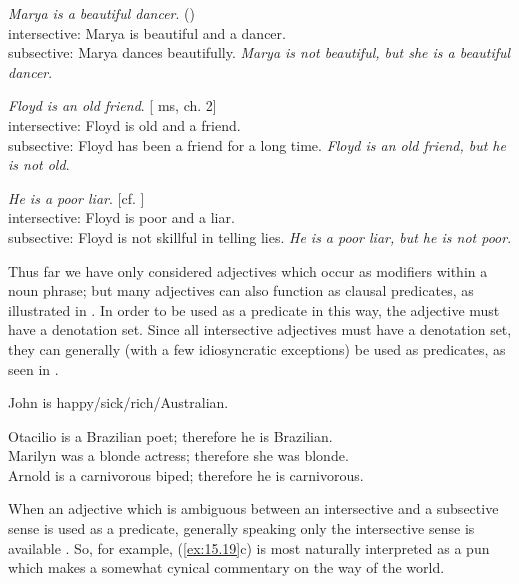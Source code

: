 \ea \label{ex:15.14}
\ea   \textit{Marya is a beautiful dancer}.   (\citealt{Siegel1976})\\
intersective: Marya is beautiful and a dancer.\\
subsective: Marya dances beautifully.
\ex  \textit{Marya is not beautiful, but she is a beautiful dancer}.
\z \z

\ea \label{ex:15.15}
\ea  \textit{Floyd is an old friend}.  \hfill [\citealt{Morzycki2013} ms, ch. 2]\\
intersective: Floyd is old and a friend.\\
subsective: Floyd has been a friend for a long time.
\ex  \textit{Floyd is an old friend, but he is not old}.
\z \z

\ea \label{ex:15.16}
\ea   \textit{He is a poor liar}.  \hfill [cf. \citealt{Bolinger1967}]\\
intersective: Floyd is poor and a liar.\\
subsective: Floyd is not skillful in telling lies.
\ex  \textit{He is a poor liar, but he is not poor}.
\z \z


Thus far we have only considered adjectives which occur as modifiers within a noun phrase; but many adjectives can also function as clausal predicates, as illustrated in . In order to be used as a predicate in this way, the adjective must have a denotation set. Since all intersective adjectives must have a denotation set, they can generally (with a few idiosyncratic exceptions) be used as predicates, as seen in .


\ea \label{ex:15.17}
John is happy/sick/rich/Australian.
\z

\ea \label{ex:15.18}
\ea  Otacilio is a Brazilian poet; therefore he is Brazilian.\\
\ex Marilyn was a blonde actress; therefore she was blonde.\\
\ex Arnold is a carnivorous biped; therefore he is carnivorous.
                       \z
\z


When an adjective which is ambiguous between an intersective and a subsective sense is used as a predicate, generally speaking only the intersective sense is available . So, for example, (\ref{ex:15.19}c) is most naturally interpreted as a pun which makes a somewhat cynical commentary on the way of the world.


\ea \label{ex:15.19}
                       \z
\z


